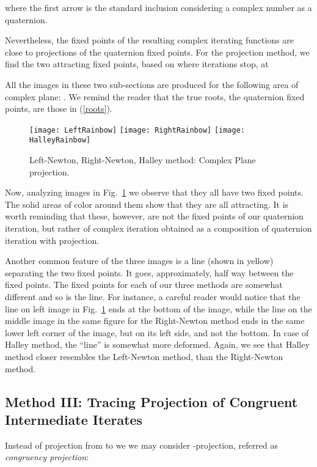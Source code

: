 \documentclass{article}
\theoremstyle{definition}
\begin{document}
where the first arrow is the standard inclusion considering  a complex number as a quaternion.

Nevertheless, the fixed points of the resulting complex iterating functions are close to projections of the quaternion fixed points.
For the projection method, we find the two attracting fixed points, based on where iterations stop, at

All the images in these two sub-sections are produced for the following area of complex plane: . We remind the reader that the true roots, the quaternion fixed points, are  those in (\ref{roots}).

\begin{figure}
\begin{center}
\texttt{[image: LeftRainbow]}
\texttt{[image: RightRainbow]}
\texttt{[image: HalleyRainbow]}
\caption{Left-Newton, Right-Newton, Halley method: Complex Plane projection.}
\label{leftComplexProjection}
\end{center}
\end{figure}
Now, analyzing images in Fig.~\ref{leftComplexProjection} we observe that they all have two fixed points. The solid areas of color around them show that they are all attracting. It is worth reminding that these, however, are not the fixed points of our quaternion iteration, but rather of complex iteration obtained as a composition of quaternion iteration with projection.

Another common feature of the three images is a line (shown in yellow) separating the two fixed points. It goes, approximately, half way between the fixed points. The fixed points for each of our three methods are somewhat different and so is the line. For instance, a careful reader would notice that the line on left image in Fig.~\ref{leftComplexProjection} ends at the bottom of the image, while the line on the middle image in the same figure for the Right-Newton method ends in the same lower left corner of the image, but on its left side, and not the bottom. In case of Halley method, the ``line'' is somewhat more deformed. Again, we see that Halley method closer resembles the Left-Newton method, than the Right-Newton method.


\subsection{Method III: Tracing Projection of Congruent Intermediate Iterates}

Instead of projection  from  to  we
we may consider -projection, referred as {\it congruency projection}:
\end{document}
